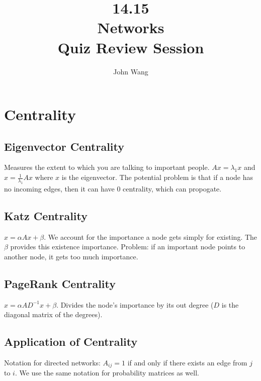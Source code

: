 \documentclass[psamsfonts]{amsart}
\title{14.15 \\
Networks \\
Quiz Review Session}
\author{John Wang}
\begin{document}
\maketitle

\section{Centrality}

\subsection{Eigenvector Centrality}

Measures the extent to which you are talking to important people. $Ax = \lambda_1 x$ and $x = \frac{1}{\lambda_1} A x$ where $x$ is the eigenvector. The potential problem is that if a node has no incoming edges, then it can have 0 centrality, which can propogate.

\subsection{Katz Centrality}

$x = \alpha A x + \beta$. We account for the importance a node gets simply for existing. The $\beta$ provides this existence importance. Problem: if an important node points to another node, it gets too much importance.

\subsection{PageRank Centrality}

$x = \alpha A D^{-1} x + \beta$. Divides the node's importance by its out degree ($D$ is the diagonal matrix of the degrees).

\subsection{Application of Centrality}

Notation for directed networks: $A_{ij} = 1$ if and only if there exists an edge from $j$ to $i$. We use the same notation for probability matrices as well.
\end{document}

